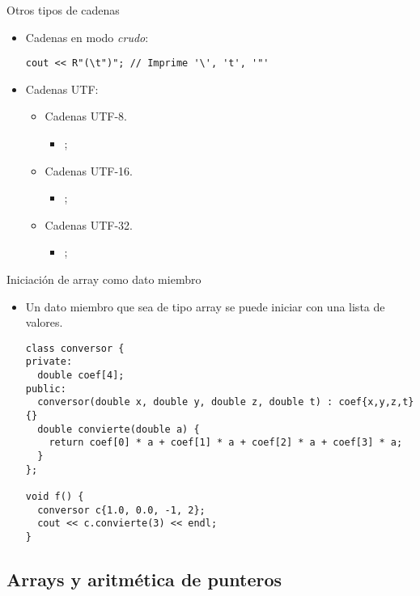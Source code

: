 \begin{frame}[fragile]{Otros tipos de cadenas}
\begin{itemize}
  \item Cadenas en modo \emph{crudo}:
\begin{lstlisting}
cout << R"(\t")"; // Imprime '\', 't', '"'
\end{lstlisting}
  \item Cadenas UTF:
    \begin{itemize}
      \item Cadenas UTF-8.
        \begin{itemize}
          \item {};
        \end{itemize}
      \item Cadenas UTF-16.
        \begin{itemize}
          \item {};
        \end{itemize}
      \item Cadenas UTF-32.
        \begin{itemize}
          \item {};
        \end{itemize}
    \end{itemize}
\end{itemize}
\end{frame}

\begin{frame}[fragile]{Iniciación de array como dato miembro}
\begin{itemize}
  \item Un dato miembro que sea de tipo array se puede iniciar con una lista de valores.
\begin{lstlisting}
class conversor {
private:
  double coef[4];
public:
  conversor(double x, double y, double z, double t) : coef{x,y,z,t} {}
  double convierte(double a) {
    return coef[0] * a + coef[1] * a + coef[2] * a + coef[3] * a;
  }
};

void f() {
  conversor c{1.0, 0.0, -1, 2};
  cout << c.convierte(3) << endl;
}
\end{lstlisting}
\end{itemize}
\end{frame}

\subsection{Arrays y aritmética de punteros}

